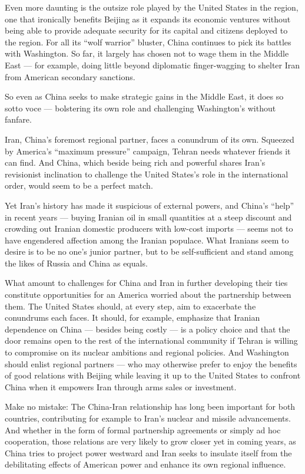 Even more daunting is the outsize role played by the United States in
the region, one that ironically benefits Beijing as it expands its
economic ventures without being able to provide adequate security for
its capital and citizens deployed to the region. For all its ``wolf
warrior'' bluster, China continues to pick its battles with Washington.
So far, it largely has chosen not to wage them in the Middle East ---
for example, doing little beyond diplomatic finger-wagging to shelter
Iran from American secondary sanctions.

So even as China seeks to make strategic gains in the Middle East, it
does so sotto voce --- bolstering its own role and challenging
Washington's without fanfare.

Iran, China's foremost regional partner, faces a conundrum of its own.
Squeezed by America's ``maximum pressure'' campaign, Tehran needs
whatever friends it can find. And China, which beside being rich and
powerful shares Iran's revisionist inclination to challenge the United
States's role in the international order, would seem to be a perfect
match.

Yet Iran's history has made it suspicious of external powers, and
China's ``help'' in recent years --- buying Iranian oil in small
quantities at a steep discount and crowding out Iranian domestic
producers with low-cost imports --- seems not to have engendered
affection among the Iranian populace. What Iranians seem to desire is to
be no one's junior partner, but to be self-sufficient and stand among
the likes of Russia and China as equals.

What amount to challenges for China and Iran in further developing their
ties constitute opportunities for an America worried about the
partnership between them. The United States should, at every step, aim
to exacerbate the conundrums each faces. It should, for example,
emphasize that Iranian dependence on China --- besides being costly ---
is a policy choice and that the door remains open to the rest of the
international community if Tehran is willing to compromise on its
nuclear ambitions and regional policies. And Washington should enlist
regional partners --- who may otherwise prefer to enjoy the benefits of
good relations with Beijing while leaving it up to the United States to
confront China when it empowers Iran through arms sales or investment.

Make no mistake: The China-Iran relationship has long been important for
both countries, contributing for example to Iran's nuclear and missile
advancements. And whether in the form of formal partnership agreements
or simply ad hoc cooperation, those relations are very likely to grow
closer yet in coming years, as China tries to project power westward and
Iran seeks to insulate itself from the debilitating effects of American
power and enhance its own regional influence.

